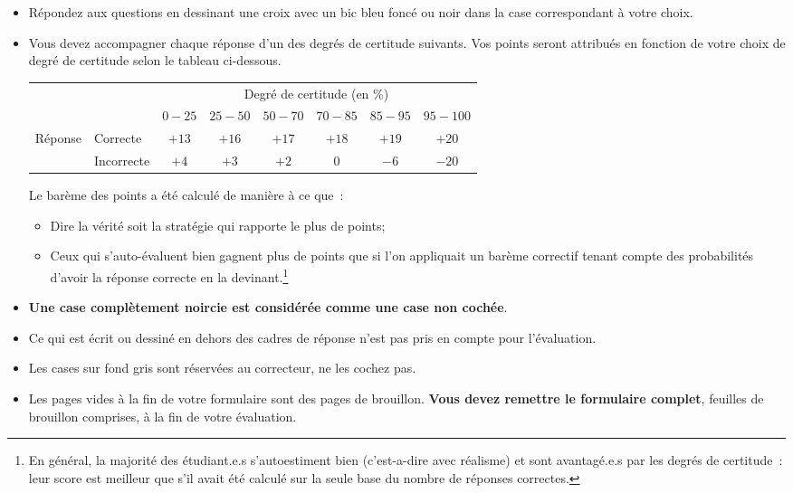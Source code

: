 \documentclass[11pt,french,a4paper,twoside]{scrartcl}
\begin{document}
{  
  \begin{itemize}
    \item Répondez aux questions en dessinant une croix avec un bic bleu foncé ou noir dans la case correspondant à votre choix.
    \item Vous devez accompagner chaque réponse d'un des degrés de certitude suivants.
          Vos points seront attribués en fonction de votre choix de degré de certitude selon le tableau ci-dessous.
          \begin{center}
            \begin{tabular}{llcccccc} \toprule
                                           &            & \multicolumn{6}{c}{Degré de certitude (en \%)}                                                              \\ \cmidrule{3-8}
                                           &            & \(0-25\)                                       & \(25-50\) & \(50-70\) & \(70-85\) & \(85-95\) & \(95-100\) \\ \midrule
              \multirow{2}{4.5em}{Réponse} & Correcte   & \(+13\)                                        & \(+16\)   & \(+17\)   & \(+18\)   & \(+19\)   & \(+20\)    \\ \cmidrule{2-8}
                                           & Incorrecte & \(+4\)                                         & \(+3\)    & \(+2\)    & \(0\)     & \(-6\)    & \(-20\)    \\ \bottomrule
            \end{tabular}
          \end{center}
          Le barème des points a été calculé de manière à ce que~:
          \begin{itemize}
            \item Dire la vérité soit la stratégie qui rapporte le plus de points;
            \item Ceux qui s'auto-évaluent bien gagnent plus de points que si l'on appliquait un barème
                  correctif tenant compte des probabilités d'avoir la réponse correcte en la devinant.\footnote{En général,
                    la majorité des étudiant.e.s s'autoestiment bien (c'est-a-dire avec réalisme) et sont avantagé.e.s
                    par les degrés de certitude~: leur score est meilleur que s'il avait été calculé sur la seule base
                    du nombre de réponses correctes.}
          \end{itemize}
    \item \textbf{Une case complètement noircie est considérée comme une case non cochée}.
    \item Ce qui est écrit ou dessiné en dehors des cadres de réponse n'est pas pris en compte pour l'évaluation.
    \item Les cases sur fond gris sont réservées au correcteur, ne les cochez pas.
    \item Les pages vides à la fin de votre formulaire sont des pages de brouillon.
          \textbf{Vous devez remettre le formulaire complet}, feuilles de brouillon comprises, à la fin de votre évaluation.
  \end{itemize}
  \clearpage





}
\end{document}
